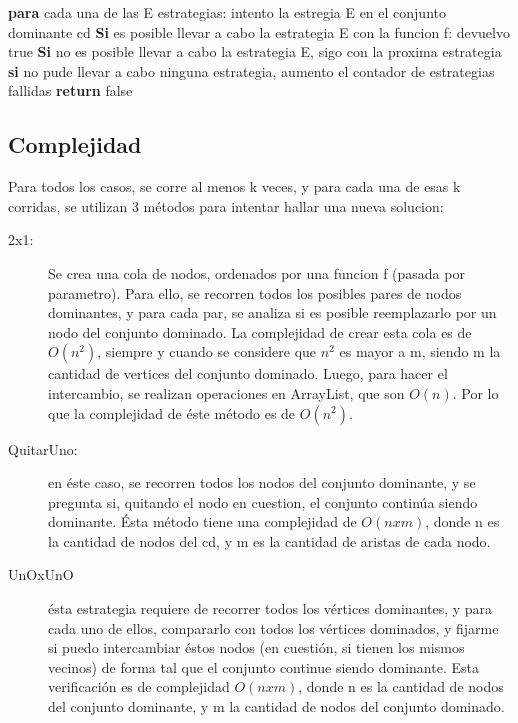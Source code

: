 \begin{codebox}
\li	\textbf{para} cada una de las E estrategias: \Do
\li		intento la estregia E en el conjunto dominante cd
\li		\textbf{Si} es posible llevar a cabo la estrategia E con la funcion f: \Do
\li			devuelvo true
\End
\li		\textbf{Si} no es posible llevar a cabo la estrategia E, sigo con la proxima estrategia
\End
\li \textbf{si} no pude llevar a cabo ninguna estrategia, aumento el contador de estrategias fallidas
\li \textbf{return} false
\end{codebox}

\subsection{Complejidad}
Para todos los casos, se corre al menos k veces, y para cada una de esas k corridas, se utilizan 3 métodos para intentar hallar una nueva solucion:
\begin{description}
\item[2x1:] Se crea una cola de nodos, ordenados por una funcion f (pasada por parametro). Para ello, se recorren todos los posibles pares de nodos dominantes, y para cada par, se analiza si es posible reemplazarlo por un nodo del conjunto dominado. La complejidad de crear esta cola es de $O(n^2)$, siempre y cuando se considere que $n^2$ es mayor a m, siendo m la cantidad de vertices del conjunto dominado. Luego, para hacer el intercambio, se realizan operaciones en ArrayList, que son $O(n)$. Por lo que la complejidad de éste método es de $O(n^2)$.
\item[QuitarUno:] en éste caso, se recorren todos los nodos del conjunto dominante, y se pregunta si, quitando el nodo en cuestion, el conjunto continúa siendo dominante. Ésta método tiene una complejidad de $O(n x m)$, donde n es la cantidad de nodos del cd, y m es la cantidad de aristas de cada nodo.
 \item[UnOxUnO] ésta estrategia requiere de recorrer todos los vértices dominantes, y para cada uno de ellos, compararlo con todos los vértices dominados, y fijarme si puedo intercambiar éstos nodos (en cuestión, si tienen los mismos vecinos) de forma tal que el conjunto continue siendo dominante. Esta verificación es de complejidad $O(n x m)$, donde n es la cantidad de nodos del conjunto dominante, y m la cantidad de nodos del conjunto dominado.
\end{description}
 
